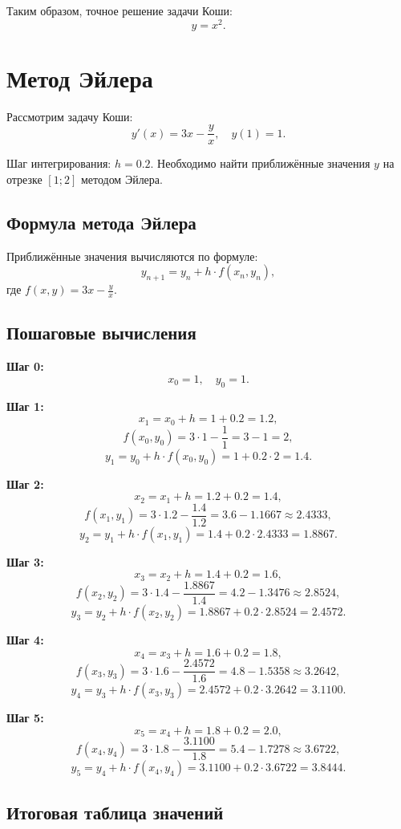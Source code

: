 \documentclass[a4paper,12pt]{article}
\begin{document}
Таким образом, точное решение задачи Коши:
\[
y = x^2.
\]


\section{Метод Эйлера}



Рассмотрим задачу Коши:
\[
y'(x) = 3x - \frac{y}{x}, \quad y(1) = 1.
\]

Шаг интегрирования: \( h = 0.2 \). Необходимо найти приближённые значения \( y \) на отрезке \([1; 2]\) методом Эйлера.

\subsection*{Формула метода Эйлера}
Приближённые значения вычисляются по формуле:
\[
y_{n+1} = y_n + h \cdot f(x_n, y_n),
\]
где \( f(x, y) = 3x - \frac{y}{x} \).

\subsection*{Пошаговые вычисления}

\textbf{Шаг 0:}
\[
x_0 = 1, \quad y_0 = 1.
\]

\textbf{Шаг 1:}
\[
x_1 = x_0 + h = 1 + 0.2 = 1.2,
\]
\[
f(x_0, y_0) = 3 \cdot 1 - \frac{1}{1} = 3 - 1 = 2,
\]
\[
y_1 = y_0 + h \cdot f(x_0, y_0) = 1 + 0.2 \cdot 2 = 1.4.
\]

\textbf{Шаг 2:}
\[
x_2 = x_1 + h = 1.2 + 0.2 = 1.4,
\]
\[
f(x_1, y_1) = 3 \cdot 1.2 - \frac{1.4}{1.2} = 3.6 - 1.1667 \approx 2.4333,
\]
\[
y_2 = y_1 + h \cdot f(x_1, y_1) = 1.4 + 0.2 \cdot 2.4333 = 1.8867.
\]

\textbf{Шаг 3:}
\[
x_3 = x_2 + h = 1.4 + 0.2 = 1.6,
\]
\[
f(x_2, y_2) = 3 \cdot 1.4 - \frac{1.8867}{1.4} = 4.2 - 1.3476 \approx 2.8524,
\]
\[
y_3 = y_2 + h \cdot f(x_2, y_2) = 1.8867 + 0.2 \cdot 2.8524 = 2.4572.
\]

\textbf{Шаг 4:}
\[
x_4 = x_3 + h = 1.6 + 0.2 = 1.8,
\]
\[
f(x_3, y_3) = 3 \cdot 1.6 - \frac{2.4572}{1.6} = 4.8 - 1.5358 \approx 3.2642,
\]
\[
y_4 = y_3 + h \cdot f(x_3, y_3) = 2.4572 + 0.2 \cdot 3.2642 = 3.1100.
\]

\textbf{Шаг 5:}
\[
x_5 = x_4 + h = 1.8 + 0.2 = 2.0,
\]
\[
f(x_4, y_4) = 3 \cdot 1.8 - \frac{3.1100}{1.8} = 5.4 - 1.7278 \approx 3.6722,
\]
\[
y_5 = y_4 + h \cdot f(x_4, y_4) = 3.1100 + 0.2 \cdot 3.6722 = 3.8444.
\]

\subsection*{Итоговая таблица значений}
\end{document}
